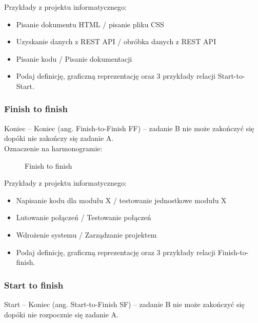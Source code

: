 \documentclass[a4paper,15pt]{article}
\begin{document}
Przykłady z projektu informatycznego:
\begin{itemize}
\item Pisanie dokumentu HTML / pisanie pliku CSS
\item Uzyskanie danych z REST API / obróbka danych z REST API
\item Pisanie kodu / Pisanie dokumentacji 
\end{itemize}


\begin{framed}
\begin{itemize}
\item Podaj definicję, graficzną reprezentację oraz 3 przykłady relacji Start-to-Start.
\end{itemize}
\end{framed}

\newpage
\subsubsection{Finish to finish}
Koniec – Koniec (ang. Finish-to-Finish FF) – zadanie B nie może zakończyć się dopóki nie zakończy się zadanie A. \\
Oznaczenie na harmonogramie:

\begin{figure}[H]
    \centering
    \qquad
    \caption{Finish to finish}%
    \label{fig:example}%
\end{figure}


Przykłady z projektu informatycznego:
\begin{itemize}
\item Napisanie kodu dla modułu X / testowanie jednostkowe modułu X
\item Lutowanie połączeń / Testowanie połączeń
\item Wdrożenie systemu / Zarządzanie projektem
\end{itemize}

\begin{framed}
\begin{itemize}
\item Podaj definicję, graficzną reprezentację oraz 3 przykłady relacji Finish-to-finish.
\end{itemize}
\end{framed}


\newpage
\subsubsection{Start to finish}
Start – Koniec (ang. Start-to-Finish SF) – zadanie B nie może zakończyć się dopóki nie rozpocznie się zadanie A. 
\end{document}
